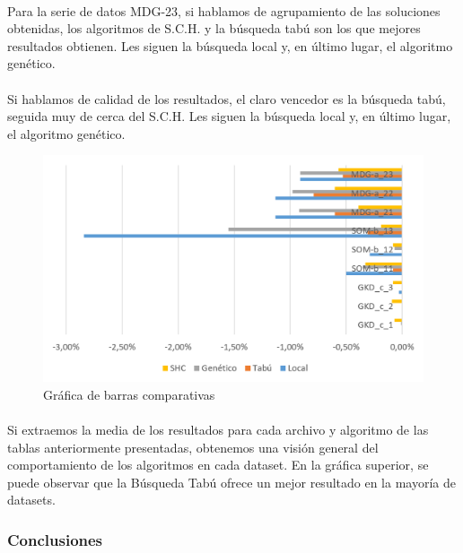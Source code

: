 	\paragraph{}Para la serie de datos MDG-23, si hablamos de agrupamiento de las soluciones obtenidas, los algoritmos de S.C.H. y la búsqueda tabú son los que mejores resultados obtienen. Les siguen la búsqueda local y, en último lugar, el algoritmo genético.
	
	\paragraph{}Si hablamos de calidad de los resultados, el claro vencedor es la búsqueda tabú, seguida muy de cerca del S.C.H. Les siguen la búsqueda local y, en último lugar, el algoritmo genético.
	
	\begin{figure}[H]
		\centering
		\includegraphics[scale=0.4]{img/MediaFinal.png}
		\caption{Gráfica de barras comparativas}
		\label{Medias_final}
	\end{figure}

	\paragraph{}Si extraemos la media de los resultados para cada archivo y algoritmo de las tablas anteriormente presentadas, obtenemos una visión general del comportamiento de los algoritmos en cada dataset. En la gráfica superior, se puede observar que la Búsqueda Tabú ofrece un mejor resultado en la mayoría de datasets.
	
	\subsubsection{Conclusiones}
	
